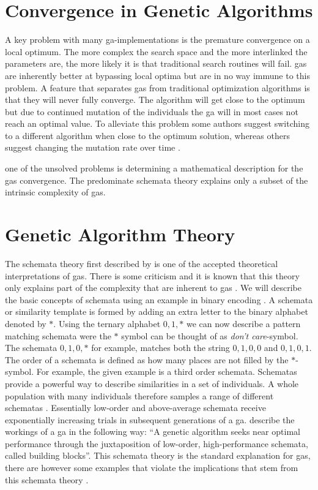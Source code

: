 \section{Convergence in Genetic Algorithms}
A key problem with many \gls{ga}-implementations is the premature convergence on a local optimum. The more complex the search space and the more interlinked the parameters are, the more likely it is that traditional search routines will fail. \glspl{ga} are inherently better at bypassing local optima but are in no way immune to this problem. A feature that separates \glspl{ga} from traditional optimization algorithms is that they will never fully converge. The algorithm will get close to the optimum but due to continued mutation of the individuals the \gls{ga} will in most cases not reach an optimal value. To alleviate this problem some authors suggest switching to a different algorithm when close to the optimum solution, whereas others suggest changing the mutation rate over time \citep[see][and references therein]{citeulike:344183}.

one of the unsolved problems is determining a mathematical description for the \glspl{ga} convergence. The predominate schemata theory explains only a subset of the intrinsic complexity of \glspl{ga}.

\section{Genetic Algorithm Theory}

The schemata theory first described by \cite{holland1975} is one of the accepted theoretical interpretations of \glspl{ga}. There is some criticism and it is known that this theory only explains part of the complexity that are inherent to \glspl{ga} \citep[see ][ and references therein]{Whitley94agenetic}. We will describe the basic concepts of schemata using an example in binary encoding \citep[notation adapted from ][]{citeulike:125978}. A schemata or similarity template is formed by adding an extra letter to the binary alphabet denoted by $*$. Using the ternary alphabet ${0, 1, *}$ we can now describe a pattern matching schemata were the $*$ symbol can be thought of as \textit{don't care}-symbol. The schemata ${0, 1, 0, *}$ for example, matches both the string ${0, 1, 0, 0}$ and ${0, 1, 0, 1}$. The order of a schemata is defined as how many places are not filled by the $*$-symbol. For example, the given example is a third order schemata. Schematas provide a powerful way to describe similarities in a set of \glspl{individual}. 
A whole population with many \glspl{individual} therefore samples a range of different schematas . Essentially low-order and above-average schemata receive exponentially increasing trials in subsequent generations of a \gls{ga}. \citet{Michalewicz:1994:GAD:184675} describe the workings of a \gls{ga} in the following way: ``A genetic algorithm seeks near optimal performance through the juxtaposition of low-order, high-performance schemata, called building blocks''.
This schemata theory is the standard explanation for \glspl{ga}, there are however some examples that violate the implications that stem from this schemata theory \citep[see chapter 3 of][for some examples]{Michalewicz:1994:GAD:184675}.

